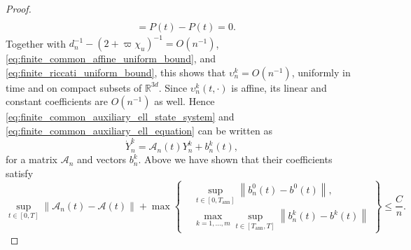 \documentclass[12pt]{article}
\numberwithin{equation}{section}
\theoremstyle{definition}
\begin{document}
\begin{proof}
\[\begin{aligned}
\\
&=P(t)-P(t)
=0.
\end{aligned}
\]
Together with \(d_n^{-1}-(2+\varpi\chi_u)^{-1}=O(n^{-1})\),
\eqref{eq:finite_common_affine_uniform_bound}, and
\eqref{eq:finite_riccati_uniform_bound}, this shows that
\(\upsilon_n^k=O(n^{-1})\), uniformly in time and on compact subsets of
\(\mathbb R^{3d}\). Since \(\upsilon_n^k(t,\cdot)\) is affine, its linear and
constant coefficients are \(O(n^{-1})\) as well. Hence
\eqref{eq:finite_common_auxiliary_ell_state_system} and
\eqref{eq:finite_common_auxiliary_ell_equation} can be written as
\begin{equation}\label{eq:finite_common_vector_system}
\dot{Y}_n^k
=
\mathcal A_n(t)Y_n^k
+b_n^k(t),
\end{equation}
for a matrix \(\mathcal A_n\) and vectors \(b_n^k\). Above we have shown that their coefficients satisfy
\begin{equation}\label{eq:finite_common_coefficient_convergence}
\sup_{t\in[0,T]}
\left\|
\mathcal A_n(t)-\mathcal A(t)
\right\|
+
\max\left\{
\begin{aligned}
&\sup_{t\in[0,T_{\mathrm{ann}}]}
\left\|b_n^0(t)-b^0(t)\right\|,\\
&\max_{k=1,\ldots,m}\sup_{t\in[T_{\mathrm{ann}},T]}
\left\|b_n^k(t)-b^k(t)\right\|
\end{aligned}
\right\}
\leq
\frac{C}{n}.
\end{equation}


\end{proof}
\end{document}
